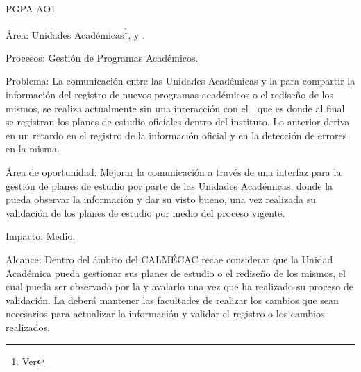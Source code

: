 
\begin{AreaOportunidad}{PGPA-AO1}
	\item[Área:] {Unidades Académicas\footnote{Ver  },  y  }.
	\item[Procesos:] Gestión de Programas Académicos.
	\item[Problema:] La comunicación entre las Unidades Académicas y la  para compartir la información del registro de nuevos programas académicos o el rediseño de los mismos, se realiza actualmente sin una interacción con el , que es donde al final se registran los planes de estudio oficiales dentro del instituto. Lo anterior deriva en un retardo en el registro de la información oficial y en la detección de errores en la misma.
	\item[Área de oportunidad:] Mejorar la comunicación a través de una interfaz para la gestión de planes de estudio por parte de las Unidades Académicas, donde la  pueda observar la información y dar su visto bueno, una vez realizada su validación de los planes de estudio por medio del proceso vigente.
	\item[Impacto:] Medio.
	\item[Alcance:] Dentro del ámbito del CALMÉCAC recae considerar que la Unidad Académica pueda gestionar sus planes de estudio o el rediseño de los mismos, el cual pueda ser observado por la  y avalarlo una vez que ha realizado su proceso de validación. La  deberá mantener las facultades de realizar los cambios que sean necesarios para actualizar la información y validar el registro o los cambios realizados.\\
	
\end{AreaOportunidad}



